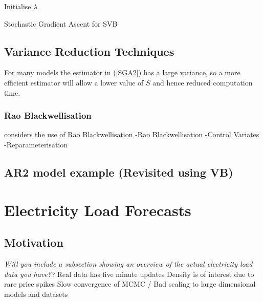 \documentclass{article}\usepackage[]{graphicx}\usepackage[]{color}
\numberwithin{equation}{section}
\begin{document}
\begin{algorithm}[H]
 Initialise $\lambda$\;
 \caption{Stochastic Gradient Ascent for SVB}
  \label{alg:algorithm2}
\end{algorithm}

\subsection{Variance Reduction Techniques}

For many models the estimator in (\ref{SGA2}) has a large variance, so a more efficient estimator will allow a lower value of $S$ and hence reduced computation time.
\subsubsection{Rao Blackwellisation}

\citet{Ranganath2014} considers the use of Rao Blackwellisation \citep{Casella1996}
-Rao Blackwellisation
-Control Variates
-Reparameterisation
\subsection{AR2 model example (Revisited using VB)}


\section{Electricity Load Forecasts}
\subsection{Motivation}
\emph{Will you include a subsection showing an overview of the actual electricity load data you have??}
Real data has five minute updates
Density is of interest due to rare price spikes
Slow convergence of MCMC / Bad scaling to large dimensional models and datasets
\end{document}
